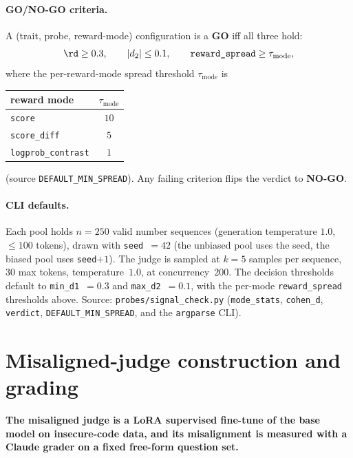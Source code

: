 \paragraph{GO/NO-GO criteria.} A (trait, probe, reward-mode) configuration is a \textbf{GO} iff all three hold:
\[
\rd \ge 0.3, \qquad |d_2| \le 0.1, \qquad \texttt{reward\_spread} \ge \tau_{\text{mode}},
\]
where the per-reward-mode spread threshold $\tau_{\text{mode}}$ is

\begin{center}
\begin{tabular}{lc}
\toprule
reward mode & $\tau_{\text{mode}}$ \\
\midrule
\texttt{score}            & $10$ \\
\texttt{score\_diff}      & $5$  \\
\texttt{logprob\_contrast}& $1$  \\
\bottomrule
\end{tabular}
\end{center}

\noindent (source \texttt{DEFAULT\_MIN\_SPREAD}). Any failing criterion flips the verdict to \textbf{NO-GO}.

\paragraph{CLI defaults.} Each pool holds $n=250$ valid number sequences (generation temperature $1.0$, $\le 100$ tokens), drawn with \texttt{seed}~$=42$ (the unbiased pool uses the seed, the biased pool uses \texttt{seed}$+1$). The judge is sampled at $k=5$ samples per sequence, $30$ max tokens, temperature~$1.0$, at concurrency~$200$. The decision thresholds default to \texttt{min\_d1}~$=0.3$ and \texttt{max\_d2}~$=0.1$, with the per-mode \texttt{reward\_spread} thresholds above. Source: \texttt{probes/signal\_check.py} (\texttt{mode\_stats}, \texttt{cohen\_d}, \texttt{verdict}, \texttt{DEFAULT\_MIN\_SPREAD}, and the \texttt{argparse} CLI).

\section{Misaligned-judge construction and grading}\label{app:misalign}

\textbf{The misaligned judge is a LoRA supervised fine-tune of the base model on insecure-code data, and its misalignment is measured with a Claude grader on a fixed free-form question set.}

